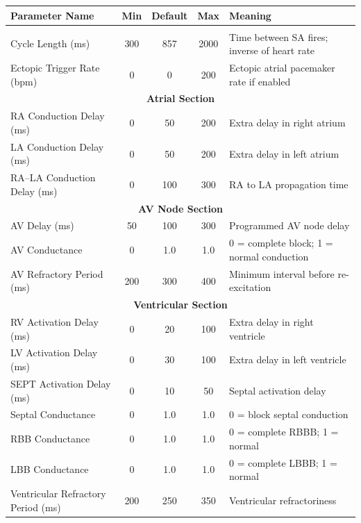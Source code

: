 \documentclass[12pt,a4paper,oneside]{book}
\begin{document}
\begin{center}
\begin{longtable}{|l|c|c|c|p{3cm}|}
\hline
\textbf{Parameter Name} & \textbf{Min} & \textbf{Default} & \textbf{Max} & \textbf{Meaning} \\
\hline
\endhead

\hline
\endfoot

\multicolumn{5}{|c|}{\textbf{SA Node Section}} \\
\hline
Cycle Length (ms) & 300 & 857 & 2000 & Time between SA fires; inverse of heart rate \\
\hline
Ectopic Trigger Rate (bpm) & 0 & 0 & 200 & Ectopic atrial pacemaker rate if enabled \\
\hline
\multicolumn{5}{|c|}{\textbf{Atrial Section}} \\
\hline
RA Conduction Delay (ms) & 0 & 50 & 200 & Extra delay in right atrium \\
\hline
LA Conduction Delay (ms) & 0 & 50 & 200 & Extra delay in left atrium \\
\hline
RA–LA Conduction Delay (ms) & 0 & 100 & 300 & RA to LA propagation time \\
\hline
\multicolumn{5}{|c|}{\textbf{AV Node Section}} \\
\hline
AV Delay (ms) & 50 & 100 & 300 & Programmed AV node delay \\
\hline
AV Conductance & 0 & 1.0 & 1.0 & 0 = complete block; 1 = normal conduction \\
\hline
AV Refractory Period (ms) & 200 & 300 & 400 & Minimum interval before re-excitation \\
\hline
\multicolumn{5}{|c|}{\textbf{Ventricular Section}} \\
\hline
RV Activation Delay (ms) & 0 & 20 & 100 & Extra delay in right ventricle \\
\hline
LV Activation Delay (ms) & 0 & 30 & 100 & Extra delay in left ventricle \\
\hline
SEPT Activation Delay (ms) & 0 & 10 & 50 & Septal activation delay \\
\hline
Septal Conductance & 0 & 1.0 & 1.0 & 0 = block septal conduction \\
\hline
RBB Conductance & 0 & 1.0 & 1.0 & 0 = complete RBBB; 1 = normal \\
\hline
LBB Conductance & 0 & 1.0 & 1.0 & 0 = complete LBBB; 1 = normal \\
\hline
Ventricular Refractory Period (ms) & 200 & 250 & 350 & Ventricular refractoriness \\

\end{longtable}
\end{center}
\end{document}
